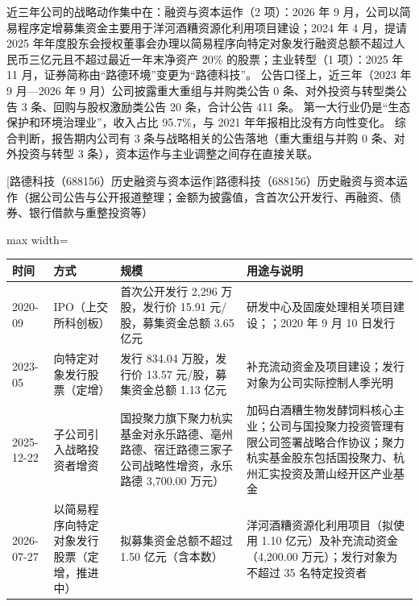  近三年公司的战略动作集中在：融资与资本运作（2 项）：2026 年 9 月，公司以简易程序定增募集资金主要用于洋河酒糟资源化利用项目建设；2024 年 4 月，提请 2025 年年度股东会授权董事会办理以简易程序向特定对象发行融资总额不超过人民币三亿元且不超过最近一年末净资产 20\% 的股票；主业转型（1 项）：2025 年 11 月，证券简称由“路德环境”变更为“路德科技”。 公告口径上，近三年（2023 年 9 月---2026 年 9 月）公司披露重大重组与并购类公告 0 条、对外投资与转型类公告 3 条、回购与股权激励类公告 20 条，合计公告 411 条。 第一大行业仍是“生态保护和环境治理业”，收入占比 95.7\%，与 2021 年年报相比没有方向性变化。 综合判断，报告期内公司有 3 条与战略相关的公告落地（重大重组与并购 0 条、对外投资与转型 3 条），资本运作与主业调整之间存在直接关联。

\begin{center}\small\setlength{\tabcolsep}{4pt}
[路德科技（688156）历史融资与资本运作]{路德科技（688156）历史融资与资本运作（据公司公告与公开报道整理；金额为披露值，含首次公开发行、再融资、债券、银行借款与重整投资等）}
\begin{adjustbox}{max width=\textwidth}
\begin{tabular}{@{}p{1.45cm}p{2.55cm}p{4.05cm}p{4.95cm}@{}}
\toprule
时间 & 方式 & 规模 & 用途与说明 \\
\midrule
2020-09 & IPO（上交所科创板） & 首次公开发行 2,\allowbreak{}296 万股，\allowbreak{}发行价 15.91 元/\allowbreak{}股，\allowbreak{}募集资金总额 3.65 亿元 & 研发中心及固废处理相关项目建设；；2020 年 9 月 10 日发行 \\
2023-05 & 向特定对象发行股票（定增） & 发行 834.04 万股，\allowbreak{}发行价 13.57 元/\allowbreak{}股，\allowbreak{}募集资金总额 1.13 亿元 & 补充流动资金及项目建设；发行对象为公司实际控制人季光明 \\
2025-12-22 & 子公司引入战略投资者增资 & 国投聚力旗下聚力杭实基金对永乐路德、\allowbreak{}亳州路德、\allowbreak{}宿迁路德三家子公司战略性增资，\allowbreak{}永乐路德 3,\allowbreak{}700.00 万元） & 加码白酒糟生物发酵饲料核心主业；公司与国投聚力投资管理有限公司签署战略合作协议；聚力杭实基金股东包括国投聚力、\allowbreak{}杭州汇实投资及萧山经开区产业基金 \\
2026-07-27 & 以简易程序向特定对象发行股票（定增，推进中） & 拟募集资金总额不超过 1.50 亿元（含本数） & 洋河酒糟资源化利用项目（拟使用 1.10 亿元）及补充流动资金（4,\allowbreak{}200.00 万元）；发行对象为不超过 35 名特定投资者 \\
\bottomrule
\end{tabular}
\end{adjustbox}
\end{center}

